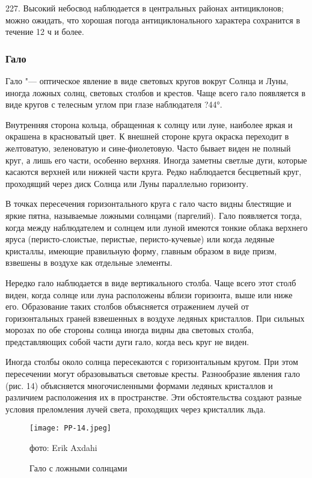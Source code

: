 227. Высокий небосвод наблюдается в центральных районах антициклонов; можно ожидать, что хорошая погода антициклонального характера сохранится в течение 12 ч и более.

\subsubsection{Гало}

Гало "--- оптическое явление в виде световых кругов вокруг Солнца и Луны, иногда ложных солнц, световых столбов и крестов. Чаще всего гало появляется в виде кругов с телесным углом при глазе наблюдателя ?44°.

Внутренняя сторона кольца, обращенная к солнцу или луне, наиболее яркая и окрашена в красноватый цвет. К внешней стороне круга окраска переходит в желтоватую, зеленоватую и сине-фиолетовую. Часто бывает виден не полный круг, а лишь его части, особенно верхняя. Иногда заметны светлые дуги, которые касаются верхней или нижней части круга. Редко наблюдается бесцветный круг, проходящий через диск Солнца или Луны параллельно горизонту.

В точках пересечения горизонтального круга с гало часто видны блестящие и яркие пятна, называемые ложными солнцами (паргелий). Гало появляется тогда, когда между наблюдателем и солнцем или луной имеются тонкие облака верхнего яруса (перисто-слоистые, перистые, перисто-кучевые) или когда ледяные кристаллы, имеющие правильную форму, главным образом в виде призм, взвешены в воздухе как отдельные элементы.

Нередко гало наблюдается в виде вертикального столба. Чаще всего этот столб виден, когда солнце или луна расположены вблизи горизонта, выше или ниже его. Образование таких столбов объясняется отражением лучей от горизонтальных граней взвешенных в воздухе ледяных кристаллов. При сильных морозах по обе стороны солнца иногда видны два световых столба, представляющих собой части дуги гало, когда весь круг не виден.

Иногда столбы около солнца пересекаются с горизонтальным кругом. При этом пересечении могут образовываться световые кресты. Разнообразие явления гало (рис. 14) объясняется многочисленными формами ледяных кристаллов и различием расположения их в пространстве. Эти обстоятельства создают разные условия преломления лучей света, проходящих через кристаллик льда.

\begin{figure}[htb]
  \centering{}
  \texttt{[image: PP-14.jpeg]}
  \caption{Гало с ложными солнцами}
  \label{fig:pp14}
  \small
  \centering{}фото: Erik Axdahi
\end{figure}

